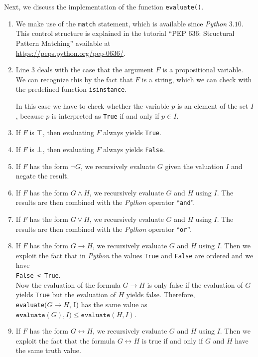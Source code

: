 \noindent
Next, we discuss the implementation of the function \texttt{evaluate()}.
\begin{enumerate}
\item We make use of the \texttt{match} statement, which is available since \textsl{Python} $3.10$.
      This control structure is explained in the tutorial ``PEP 636: Structural Pattern Matching''
      available at
      \\[0.2cm]
      \hspace*{1.3cm}
      \href{https://peps.python.org/pep-0636/}{https://peps.python.org/pep-0636/}.
\item Line 3 deals with the case that the argument $F$ is a propositional variable.  We can recognize this by
      the fact that $F$ is a string, which we can check with the predefined function
      \texttt{isinstance}.

      In this case we have to check whether the variable $p$ is an element of the set $I$, because $p$ is
      interpreted as \texttt{True} if and only if $p \in I$.
\item If $F$ is $\top$, then evaluating $F$ always yields \texttt{True}.
\item If $F$ is $\bot$, then evaluating $F$ always yields \texttt{False}. 
\item If $F$ has the form $\neg G$, we recursively evaluate $G$ given the valuation $I$ and negate the result.
\item If $F$ has the form $G \wedge H$, we recursively evaluate
      $G$ and $H$ using $I$.  The results are then combined with the \textsl{Python} operator
      ``\texttt{and}''.
\item If $F$ has the form $G \vee H$, we recursively evaluate
      $G$ and $H$ using $I$.  The results are then combined with the \textsl{Python} operator
      ``\texttt{or}''.
\item If $F$ has the form $G \rightarrow H$, we recursively evaluate
      $G$ and $H$ using $I$.  Then we exploit the fact that in \textsl{Python} the values \texttt{True} and
      \texttt{False} are ordered and we have
      \\[0.2cm]
      \hspace*{1.3cm}
      \texttt{False < True}.
      \\[0.2cm]
      Now the evaluation of the formula $G \rightarrow H$ is only false if the evaluation of $G$ yields \texttt{True} but the
      evaluation of $H$ yields false.  Therefore, 
      \\[0.2cm]
      \hspace*{1.3cm}
      \texttt{evaluate}($G \rightarrow H$, I) \quad has the same value as \quad
      $\texttt{evaluate}(G), I) \leq \texttt{evaluate}(H, I)$.
\item If $F$ has the form $G \leftrightarrow H$, we recursively evaluate
      $G$ and $H$ using $I$.  Then we exploit the fact that the formula $G \leftrightarrow H$ is true if and
      only if $G$ and $H$ have the same truth value.
\end{enumerate}

